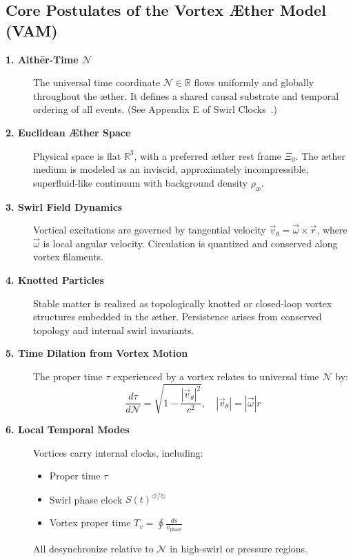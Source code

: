 \documentclass[preprint]{revtex4-2}
\begin{document}
    \subsection{Core Postulates of the Vortex Æther Model (VAM)}

    \begin{description}
        \item[\textbf{1. Aithēr-Time \(\mathcal{N}\)}]%
        The universal time coordinate \( \mathcal{N} \in \mathbb{R} \) flows uniformly and globally throughout the æther. It defines a shared
        causal substrate and temporal ordering of all events. (See Appendix E of Swirl Clocks~\cite{iskandarani2025vam2}.)

        \item[\textbf{2. Euclidean Æther Space}]%
        Physical space is flat \( \mathbb{R}^3 \), with a preferred æther rest frame \( \Xi_0 \). The æther medium is modeled as an inviscid, approximately incompressible, superfluid-like continuum with background density \( \rho_{\text{\ae}} \).

        \item[\textbf{3. Swirl Field Dynamics}]%
        Vortical excitations are governed by tangential velocity \( \vec{v}_\theta = \vec{\omega} \times \vec{r} \), where \( \vec{\omega} \) is local angular velocity. Circulation is quantized and conserved along vortex filaments.

        \item[\textbf{4. Knotted Particles}]%
        Stable matter is realized as topologically knotted or closed-loop vortex structures embedded in the æther. Persistence arises from conserved topology and internal swirl invariants.

        \item[\textbf{5. Time Dilation from Vortex Motion}]%
        The proper time \( \tau \) experienced by a vortex relates to universal time \( \mathcal{N} \) by:
        \begin{equation}
            \boxed{
                \frac{d\tau}{d\mathcal{N}} = \sqrt{1 - \frac{|\vec{v}_\theta|^2}{c^2}}, \quad |\vec{v}_\theta| = |\vec{\omega}| r
            }
            \label{eq:tau-dilation}
        \end{equation}


        \item[\textbf{6. Local Temporal Modes}]%
        Vortices carry internal clocks, including:
        \begin{itemize}
            \item Proper time \( \tau \)
            \item Swirl phase clock \( S(t)^{\circlearrowleft\!/\!\circlearrowright} \)
            \item Vortex proper time \( T_v = \oint \frac{ds}{v_\text{phase}} \)
        \end{itemize}
        All desynchronize relative to \( \mathcal{N} \) in high-swirl or pressure regions.


\end{description}
\end{document}
